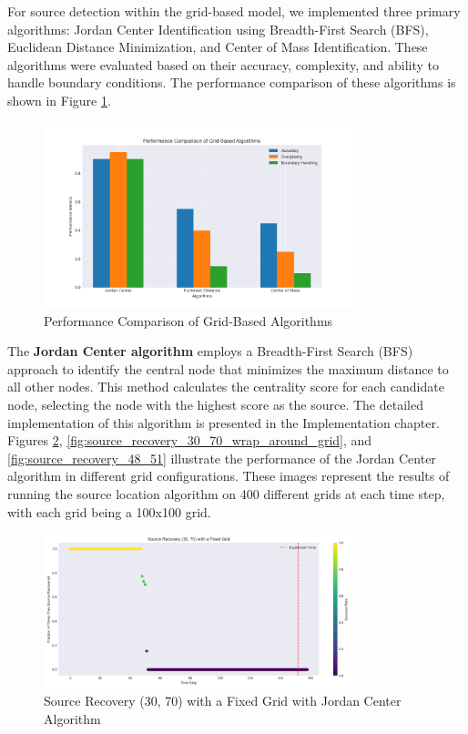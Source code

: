 For source detection within the grid-based model, we implemented three primary algorithms: Jordan Center Identification using Breadth-First Search (BFS), Euclidean Distance Minimization, and Center of Mass Identification. These algorithms were evaluated based on their accuracy, complexity, and ability to handle boundary conditions. The performance comparison of these algorithms is shown in Figure \ref{fig:grid_algorithm_performance}.

\begin{figure}[H]
    \centering
    \includegraphics[width=0.8\textwidth]{grid_algorithm_performance.png}
    \caption{Performance Comparison of Grid-Based Algorithms}
    \label{fig:grid_algorithm_performance}
\end{figure}

The \textbf{Jordan Center algorithm} employs a Breadth-First Search (BFS) approach to identify the central node that minimizes the maximum distance to all other nodes. This method calculates the centrality score for each candidate node, selecting the node with the highest score as the source. The detailed implementation of this algorithm is presented in the Implementation chapter.\\

Figures \ref{fig:source_recovery_30_70_fixed_grid}, \ref{fig:source_recovery_30_70_wrap_around_grid}, and \ref{fig:source_recovery_48_51} illustrate the performance of the Jordan Center algorithm in different grid configurations. These images represent the results of running the source location algorithm on 400 different grids at each time step, with each grid being a 100x100 grid.

\begin{figure}[H]
    \centering
    \includegraphics[width=0.8\textwidth]{source_recovery_30_70_Fixed_Grid.png}
    \caption{Source Recovery (30, 70) with a Fixed Grid with Jordan Center Algorithm}
    \label{fig:source_recovery_30_70_fixed_grid}
\end{figure}

